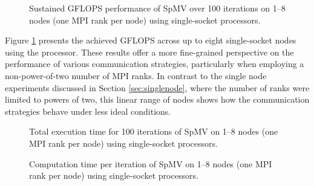 \begin{figure}[H]
    \centering
    \caption{Sustained GFLOPS performance of SpMV over 100 iterations on 1–8 nodes (one MPI rank per node) using single-socket \romeq{} processors.}
    \label{fig:gflopsromemulti}
\end{figure}

Figure \ref{fig:gflopsromemulti} presents the achieved GFLOPS across up to eight single-socket nodes using the \romeq{} processor. These results offer a more fine-grained perspective on the performance of various communication strategies, particularly when employing a non-power-of-two number of MPI ranks. In contrast to the single node experiments discussed in Section \ref{sec:singlenode}, where the number of ranks were limited to powers of two, this linear range of nodes shows how the communication strategies behave under less ideal conditions.
\medskip






\begin{figure}[H]
    \centering
    \caption{Total execution time for 100 iterations of SpMV on 1–8 nodes (one MPI rank per node) using single-socket \romeq{} processors.}
    \label{fig:tromemulti}
\end{figure}

\begin{figure}[H]
    \centering
    \caption{Computation time per iteration of SpMV on 1–8 nodes (one MPI rank per node) using single-socket \romeq{} processors.}
    \label{fig:tcomp2x4multirome16q}
\end{figure}


